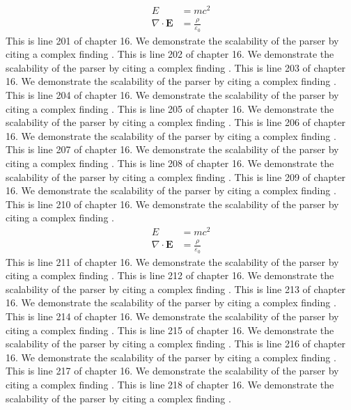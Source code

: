 \begin{align*}
  E &= mc^2 \\
  \nabla \cdot \mathbf{E} &= \frac{\rho}{\varepsilon_0}
\end{align*}
This is line 201 of chapter 16. We demonstrate the scalability of the parser by citing a complex finding \cite{ref16_201}.
This is line 202 of chapter 16. We demonstrate the scalability of the parser by citing a complex finding \cite{ref16_202}.
This is line 203 of chapter 16. We demonstrate the scalability of the parser by citing a complex finding \cite{ref16_203}.
This is line 204 of chapter 16. We demonstrate the scalability of the parser by citing a complex finding \cite{ref16_204}.
This is line 205 of chapter 16. We demonstrate the scalability of the parser by citing a complex finding \cite{ref16_205}.
This is line 206 of chapter 16. We demonstrate the scalability of the parser by citing a complex finding \cite{ref16_206}.
This is line 207 of chapter 16. We demonstrate the scalability of the parser by citing a complex finding \cite{ref16_207}.
This is line 208 of chapter 16. We demonstrate the scalability of the parser by citing a complex finding \cite{ref16_208}.
This is line 209 of chapter 16. We demonstrate the scalability of the parser by citing a complex finding \cite{ref16_209}.
This is line 210 of chapter 16. We demonstrate the scalability of the parser by citing a complex finding \cite{ref16_210}.
\begin{align*}
  E &= mc^2 \\
  \nabla \cdot \mathbf{E} &= \frac{\rho}{\varepsilon_0}
\end{align*}
This is line 211 of chapter 16. We demonstrate the scalability of the parser by citing a complex finding \cite{ref16_211}.
This is line 212 of chapter 16. We demonstrate the scalability of the parser by citing a complex finding \cite{ref16_212}.
This is line 213 of chapter 16. We demonstrate the scalability of the parser by citing a complex finding \cite{ref16_213}.
This is line 214 of chapter 16. We demonstrate the scalability of the parser by citing a complex finding \cite{ref16_214}.
This is line 215 of chapter 16. We demonstrate the scalability of the parser by citing a complex finding \cite{ref16_215}.
This is line 216 of chapter 16. We demonstrate the scalability of the parser by citing a complex finding \cite{ref16_216}.
This is line 217 of chapter 16. We demonstrate the scalability of the parser by citing a complex finding \cite{ref16_217}.
This is line 218 of chapter 16. We demonstrate the scalability of the parser by citing a complex finding \cite{ref16_218}.
